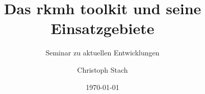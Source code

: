 


\title{Das rkmh toolkit und seine Einsatzgebiete}
\subtitle{Seminar zu aktuellen Entwicklungen}
\author{Christoph Stach}

\date{\today}














